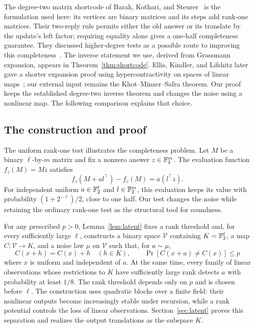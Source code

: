 The degree-two matrix shortcode of Barak, Kothari, and
Steurer~\cite{BKS18} is the formulation used here: its vertices are
binary matrices and its steps add rank-one matrices. Their two-reply rule
permits either the old answer or its translate by the update's left factor;
requiring equality alone gives a one-half completeness guarantee. They
discussed higher-degree tests as a possible route to improving this
completeness~\cite[Section~1.6]{BKS18}. The inverse statement we use,
derived from Grassmann expansion, appears in Theorem~\ref{thm:shortcode}.
Ellis, Kindler, and Lifshitz later gave a shorter expansion proof using
hypercontractivity on spaces of linear maps~\cite{EKL26}; our external
input remains the Khot--Minzer--Safra theorem. Our proof keeps the
established degree-two inverse theorem and changes the noise using a
nonlinear map. The following comparison explains that choice.

\subsection{The construction and proof}

The uniform rank-one test illustrates the completeness problem. Let
\(M\) be a binary \(\ell\)-by-\(m\) matrix and fix a nonzero answer
\(z\in\mathbb F_2^m\). The evaluation function \(f_z(M)=Mz\) satisfies
\[
 f_z(M+a l^\top)-f_z(M)=a(l^\top z).
\]
For independent uniform \(a\in\mathbb F_2^\ell\) and \(l\in\mathbb F_2^m\), this
evaluation keeps its value with probability \((1+2^{-\ell})/2\), close
to one half. Our test changes the noise while retaining the ordinary
rank-one test as the structural tool for soundness.

For any prescribed \(p>0\), Lemma~\ref{lem:latent} fixes a rank threshold
and, for every sufficiently large \(\ell\), constructs a binary space
\(\mathcal V\) containing \(K=\mathbb F_2^\ell\), a map
\(C:\mathcal V\to K\), and a noise law \(\mu\) on \(\mathcal V\)
such that, for \(a\sim\mu\),
\[
 C(x+h)=C(x)+h\quad(h\in K),\qquad
 \Pr[C(x+a)\ne C(x)]\le p
\]
where \(x\) is uniform and independent of \(a\). At the same time, every
family of linear observations
whose restrictions to \(K\) have sufficiently large rank detects
\(a\) with probability at least \(1/8\). The rank threshold depends
only on \(p\) and is chosen before \(\ell\). The construction uses
quadratic blocks over a finite field: their nonlinear outputs become
increasingly stable under recursion, while a rank potential controls the
loss of linear observations. Section~\ref{sec:latent} proves this
separation and realizes the output translations as the subspace \(K\).

